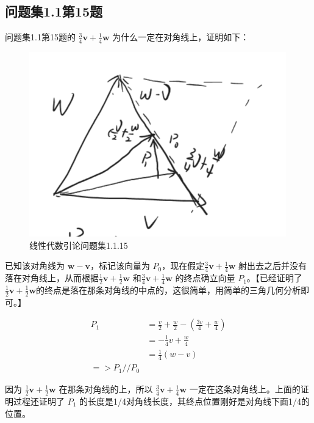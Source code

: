 \documentclass[12pt,oneside]{book}
\begin{document}
\subsection{问题集1.1第15题}
\cite{线性代数引论}问题集1.1第15题的 $\frac{3}{4}\boldsymbol{v} + \frac{1}{4}\boldsymbol{w}$ 为什么一定在对角线上，证明如下：

\begin{figure}[H]
\centering
\includegraphics[width=\linewidth ,totalheight=0.95\textheight , keepaspectratio]{线性代数引论问题集1_1_15.png}
\caption{线性代数引论问题集1.1.15}
\end{figure}

已知该对角线为 $\boldsymbol{w} - \boldsymbol{v}$，标记该向量为 $P_0$，现在假定$\frac{3}{4}\boldsymbol{v} + \frac{1}{4}\boldsymbol{w}$ 射出去之后并没有落在对角线上，从而根据$\frac{1}{2}\boldsymbol{v} + \frac{1}{2}\boldsymbol{w}$ 和$\frac{3}{4}\boldsymbol{v} + \frac{1}{4}\boldsymbol{w}$ 的终点确立向量 $P_1$。【已经证明了$\frac{1}{2}\boldsymbol{v} + \frac{1}{2}\boldsymbol{w}$的终点是落在那条对角线的中点的，这很简单，用简单的三角几何分析即可。】

\begin{align*}
P_1 &= \frac{v}{2} + \frac{w}{2} - (\frac{3v}{4} + \frac{w}{4}) \\
    &= -\frac{1}{4}v + \frac{w}{4} \\
    &= \frac{1}{4}(w-v) \\    
 => P_1 // P_0
\end{align*}

因为 $\frac{1}{2}\boldsymbol{v} + \frac{1}{2}\boldsymbol{w}$ 在那条对角线的上，所以 $\frac{3}{4}\boldsymbol{v} + \frac{1}{4}\boldsymbol{w}$ 一定在这条对角线上。上面的证明过程还证明了 $P_1$ 的长度是1/4对角线长度，其终点位置刚好是对角线下面1/4的位置。
\end{document}

